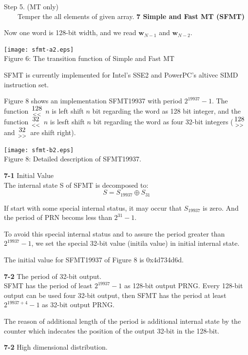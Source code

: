 \documentclass[a4j,12pt,landscape]{jarticle}
\def\bw{{{\mathbf w}}}
\newcommand{\lshift}[1]{{\large $\mbox{#1}\atop<<$}}
\newcommand{\rshift}[1]{{\large $\mbox{#1}\atop >>$}}
\begin{document}
Step 5. (MT only)\\
~~~~Temper the all elements of given array. 
\newpage
\noindent
{\bf 7 Simple and Fast MT (SFMT)}

Now one word is 128-bit width,
and we read $\bw_{N-1}$ and $\bw_{N-2}$.

\begin{center}
\texttt{[image: sfmt-a2.eps]}
\\
Figure 6: The transition function of Simple and Fast MT
\end{center}
SFMT is currently implemented for Intel's SSE2 and PowerPC's altivec SIMD
instruction set.


\newpage
Figure 8 shows an implementation SFMT19937 with period
$2^{19937}-1$.  The function \lshift{128} $n$ is left shift $n$ bit
regarding the word as 128 bit integer, and the function \lshift{32} $n$ is
lesft shift $n$ bit regarding the word as four 32-bit integers
(\rshift{128} and \rshift{32} are shift right).

\begin{center}
\texttt{[image: sfmt-b2.eps]}
\\
Figure 8: Detailed description of SFMT19937.
\end{center}

\newpage
{\bf 7-1} Initial Value\\
The internal state S of SFMT is decomposed to:
$$
S = S_{19937} \oplus S_{31}
$$

If start with some special internal status,
it may occur that $S_{19937}$ is zero.
And the period of PRN becoms less than $2^{31}-1$.

To avoid this special internal status and to assure
the period greater than $2^{19937}-1$,
we set the special 32-bit value (initila value) in 
initial internal state.

The initial value for SFMT19937 of Figure 8 is 0x4d734d6d.

\newpage
{\bf 7-2} The period of 32-bit output.\\
SFMT has the period of least $2^{19937}-1$ as 128-bit output PRNG.
Every 128-bit output can be used four 32-bit output, then
SFMT has the period at least $2^{19937+4}-1$ as 32-bit output PRNG.

The reason of additional length of the period is additional 
internal state by the counter which indecates the position of
the output 32-bit in the 128-bit. 

\newpage
\noindent
{\bf 7-2} High dimensional distribution.
\end{document}
